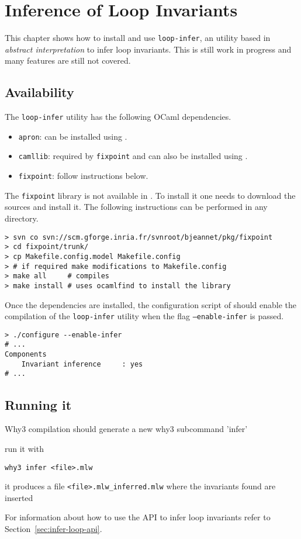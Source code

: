 
\chapter{Inference of Loop Invariants}
\label{chp:infer-loop}

This chapter shows how to install and use \texttt{loop-infer}, an
utility based in \emph{abstract interpretation} to infer loop
invariants. This is still work in progress and many features are still
not covered.

\section{Availability}

The \texttt{loop-infer} utility has the following OCaml dependencies.
%
\begin{itemize}
\item \texttt{apron}: can be installed using \opam.
\item \texttt{camllib}: required by \texttt{fixpoint} and can also be
  installed using \opam.
\item \texttt{fixpoint}: follow instructions below.
\end{itemize}

The \texttt{fixpoint} library is not available in \opam. To install it
one needs to download the sources and install it. The following
instructions can be performed in any directory.
%
\begin{verbatim}
> svn co svn://scm.gforge.inria.fr/svnroot/bjeannet/pkg/fixpoint
> cd fixpoint/trunk/
> cp Makefile.config.model Makefile.config
> # if required make modifications to Makefile.config
> make all     # compiles
> make install # uses ocamlfind to install the library
\end{verbatim}

Once the dependencies are installed, the configuration script of \why
should enable the compilation of the \texttt{loop-infer} utility when
the flag \texttt{--enable-infer} is passed.

\begin{verbatim}
> ./configure --enable-infer
# ...
Components
    Invariant inference     : yes
# ...
\end{verbatim}

\section{Running it}


Why3 compilation should generate a new why3 subcommand 'infer'

run it with
\begin{verbatim}
why3 infer <file>.mlw
\end{verbatim}

it produces a file \verb|<file>.mlw_inferred.mlw| where the invariants found are inserted


For information about how to use the API to infer loop invariants
refer to Section~\ref{sec:infer-loop-api}.

